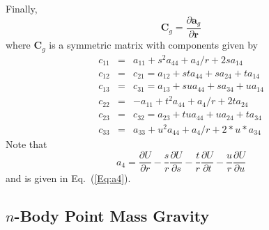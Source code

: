 Finally,
%
\begin{equation}
   \mathbf{C}_g = \frac{\partial \mathbf{a}_g}{\partial \mathbf{r}}
\end{equation}
%
where $\mathbf{C}_g$ is a symmetric matrix with components given by
%
\begin{eqnarray}
   c_{11} & = & a_{11} + s^2a_{44} + a_4/r + 2sa_{14} \\
%
   c_{12} & = & c_{21} = a_{12}+ sta_{44} + sa_{24} + ta_{14}\\
%
   c_{13} & = & c_{31} = a_{13}+ sua_{44} + sa_{34} + ua_{14}\\
%
   c_{22} & = & -a_{11} +t^2a_{44} + a_4/r +2ta_{24}\\
%
   c_{23} & = & c_{32} = a_{23} + tua_{44} + ua_{24} + ta_{34}\\
%
   c_{33} & = & a_{33} + u^2a_{44} + a_4/r + 2*u*a_{34}
\end{eqnarray}
%
Note that
%
\begin{equation}
    a_4 = \frac{\partial U}{\partial r} - \frac{s}{r}\frac{\partial U}{\partial s}
    -\frac{t}{r}\frac{\partial U}{\partial t} -\frac{u}{r}\frac{\partial U}{\partial u}
\end{equation}
%
and is given in Eq.~(\ref{Eq:a4}).

\subsection{$n$-Body Point Mass Gravity}

